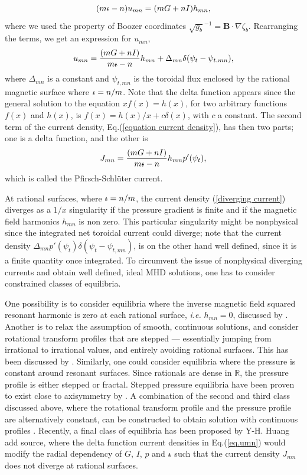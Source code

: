 \documentclass[my_thesis.tex]{subfiles}
\begin{document}
\begin{equation}
	(m\text{$\iota\!\!$-} - n)u_{mn} = (mG + nI)h_{mn},
\end{equation}
where we used the property of Boozer coordinates $\sqrt{g_b}^{-1}=\mathbf{B}\cdot\nabla\zeta_b$. Rearranging the terms, we get an expression for $u_{mn}$,
\begin{equation}
	u_{mn} = \frac{(mG + nI)}{m\text{$\iota\!\!$-} - n}h_{mn} + \Delta_{mn}\delta(\psi_t-\psi_{t,mn}),\label{eq.umn}
\end{equation}
where $\Delta_{mn}$ is a constant and $\psi_{t,mn}$ is the toroidal flux enclosed by the rational magnetic surface where $\text{$\iota\!\!$-}=n/m$. Note that the delta function appears since the general solution to the equation $xf(x)=h(x)$, for two arbitrary functions $f(x)$ and $h(x)$, is $f(x) = h(x)/x + c\delta(x)$, with $c$ a constant. The second term of the current density, Eq.(\ref{equation current density}), has then two parts; one is a delta function, and the other is
\begin{equation}
	J_{mn} = \frac{(mG + nI)}{m\text{$\iota\!\!$-} - n}h_{mn}p'(\psi_t),\label{diverging current}
\end{equation}
which is called the Pfirsch-Schl\"uter current.

At rational surfaces, where $\text{$\iota\!\!$-}=n/m$, the current density (\ref{diverging current}) diverges as a $1/x$ singularity if the pressure gradient is finite and if the magnetic field harmonics $h_{mn}$ is non zero. This particular singularity might be nonphysical since the integrated net toroidal current could diverge; note that the current density $\Delta_{mn} p'(\psi_t) \delta(\psi_t-\psi_{t,mn})$, is on the other hand well defined, since it is a finite quantity once integrated. To circumvent the issue of nonphysical diverging currents and obtain well defined, ideal MHD solutions, one has to consider constrained classes of equilibria.

One possibility is to consider equilibria where the inverse magnetic field squared resonant harmonic is zero at each rational surface, \emph{i.e.} $h_{mn}=0$, discussed by \citet{Weitzner2014}. Another is to relax the assumption of smooth, continuous solutions, and consider rotational transform profiles that are stepped --- essentially jumping from irrational to irrational values, and entirely avoiding rational surfaces. This has been discussed by \citet{Loizu2015a}. Similarly, one could consider equilibria where the pressure is constant around resonant surfaces. Since rationals are dense in $\mathbb{R}$, the pressure profile is either stepped or fractal. Stepped pressure equilibria have been proven to exist close to axisymmetry by \citet{Bruno1996}. A combination of the second and third class discussed above, where the rotational transform profile and the pressure profile are alternatively constant, can be constructed to obtain solution with continuous profiles \citep{Hudson2017a}. Recently, a final class of equilibria has been proposed by Y-H. Huang {\color{red} add source}, where the delta function current densities in Eq.(\ref{eq.umn}) would modify the radial dependency of $G$, $I$, $p$ and $\text{$\iota\!\!$-}$ such that the current density $J_{mn}$ does not diverge at rational surfaces.
\end{document}
